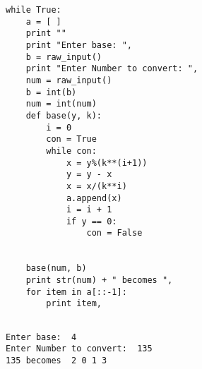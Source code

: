 \documentclass{tufte-handout}
\begin{document}
\begin{framed}
\begin{verbatim}
while True:
    a = [ ]
    print ""
    print "Enter base: ",
    b = raw_input()
    print "Enter Number to convert: ",
    num = raw_input()
    b = int(b)
    num = int(num)
    def base(y, k):
        i = 0
        con = True
        while con:
            x = y%(k**(i+1))
            y = y - x
            x = x/(k**i)
            a.append(x)
            i = i + 1
            if y == 0:
                con = False


    base(num, b)
    print str(num) + " becomes ",
    for item in a[::-1]:
        print item,

\end{verbatim}
\end{framed}


\begin{shaded}
\begin{verbatim}

Enter base:  4
Enter Number to convert:  135
135 becomes  2 0 1 3 

\end{verbatim}
\end{shaded}



\vspace{1cm}



\end{document}
